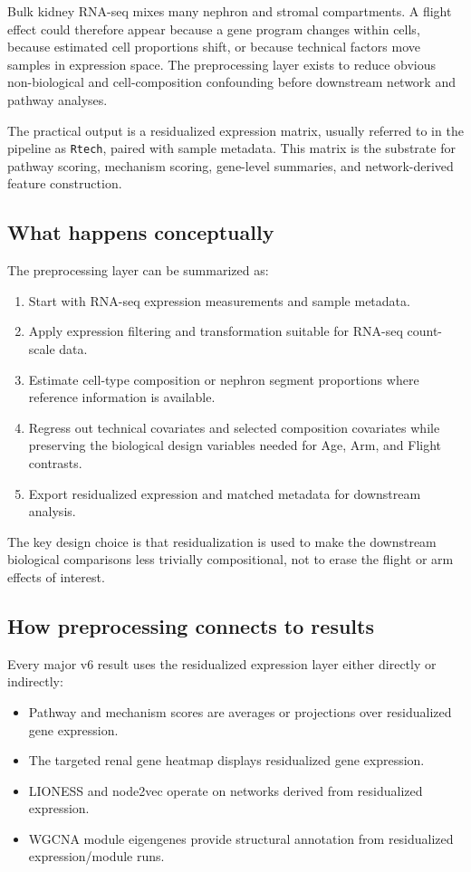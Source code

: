 \documentclass[11pt]{article}
\newcommand{\code}[1]{\texttt{#1}}
\begin{document}
Bulk kidney RNA-seq mixes many nephron and stromal compartments. A flight effect could therefore appear because a gene program changes within cells, because estimated cell proportions shift, or because technical factors move samples in expression space. The preprocessing layer exists to reduce obvious non-biological and cell-composition confounding before downstream network and pathway analyses.

The practical output is a residualized expression matrix, usually referred to in the pipeline as \code{Rtech}, paired with sample metadata. This matrix is the substrate for pathway scoring, mechanism scoring, gene-level summaries, and network-derived feature construction.

\subsection{What happens conceptually}

The preprocessing layer can be summarized as:

\begin{enumerate}
  \item Start with RNA-seq expression measurements and sample metadata.
  \item Apply expression filtering and transformation suitable for RNA-seq count-scale data.
  \item Estimate cell-type composition or nephron segment proportions where reference information is available.
  \item Regress out technical covariates and selected composition covariates while preserving the biological design variables needed for Age, Arm, and Flight contrasts.
  \item Export residualized expression and matched metadata for downstream analysis.
\end{enumerate}

The key design choice is that residualization is used to make the downstream biological comparisons less trivially compositional, not to erase the flight or arm effects of interest.

\subsection{How preprocessing connects to results}

Every major v6 result uses the residualized expression layer either directly or indirectly:

\begin{itemize}
  \item Pathway and mechanism scores are averages or projections over residualized gene expression.
  \item The targeted renal gene heatmap displays residualized gene expression.
  \item LIONESS and node2vec operate on networks derived from residualized expression.
  \item WGCNA module eigengenes provide structural annotation from residualized expression/module runs.
\end{itemize}
\end{document}
